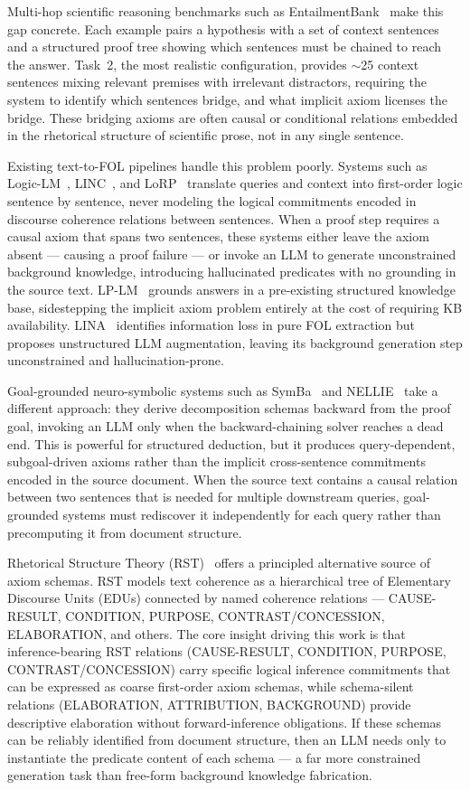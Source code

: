 \documentclass[11pt,letterpaper]{article}
\begin{document}
Multi-hop scientific reasoning benchmarks such as EntailmentBank~\citep{Dalvi2021} make this gap concrete. Each example
pairs a hypothesis with a set of context sentences and a structured proof tree showing which sentences must be chained to
reach the answer. Task~2, the most realistic configuration, provides $\sim$25 context sentences mixing relevant premises
with irrelevant distractors, requiring the system to identify which sentences bridge, and what implicit axiom licenses
the bridge. These bridging axioms are often causal or conditional relations embedded in the rhetorical structure of
scientific prose, not in any single sentence.

Existing text-to-FOL pipelines handle this problem poorly. Systems such as Logic-LM~\citep{Pan2023},
LINC~\citep{Olausson2023}, and LoRP~\citep{Di2025} translate queries and context into first-order logic sentence by
sentence, never modeling the logical commitments encoded in discourse coherence relations between sentences. When a proof
step requires a causal axiom that spans two sentences, these systems either leave the axiom absent --- causing a proof
failure --- or invoke an LLM to generate unconstrained background knowledge, introducing hallucinated predicates with no
grounding in the source text. LP-LM~\citep{Wu2025} grounds answers in a pre-existing structured knowledge base,
sidestepping the implicit axiom problem entirely at the cost of requiring KB availability. LINA~\citep{Li2024} identifies
information loss in pure FOL extraction but proposes unstructured LLM augmentation, leaving its background generation
step unconstrained and hallucination-prone.

Goal-grounded neuro-symbolic systems such as SymBa~\citep{Lee2024} and NELLIE~\citep{Weir2024} take a different
approach: they derive decomposition schemas backward from the proof goal, invoking an LLM only when the
backward-chaining solver reaches a dead end. This is powerful for structured deduction, but it produces
query-dependent, subgoal-driven axioms rather than the implicit cross-sentence commitments encoded in the source
document. When the source text contains a causal relation between two sentences that is needed for multiple downstream
queries, goal-grounded systems must rediscover it independently for each query rather than precomputing it from
document structure.

Rhetorical Structure Theory (RST)~\citep{Mann1988} offers a principled alternative source of axiom schemas. RST models
text coherence as a hierarchical tree of Elementary Discourse Units (EDUs) connected by named coherence relations ---
CAUSE-RESULT, CONDITION, PURPOSE, CONTRAST/CONCESSION, ELABORATION, and others. The core insight driving this work is
that inference-bearing RST relations (CAUSE-RESULT, CONDITION, PURPOSE, CONTRAST/CONCESSION) carry specific logical
inference commitments that can be expressed as coarse first-order axiom schemas, while schema-silent relations
(ELABORATION, ATTRIBUTION, BACKGROUND) provide descriptive elaboration without forward-inference obligations. If these
schemas can be reliably identified from document structure, then an LLM needs only to instantiate the predicate content
of each schema --- a far more constrained generation task than free-form background knowledge fabrication.
\end{document}
